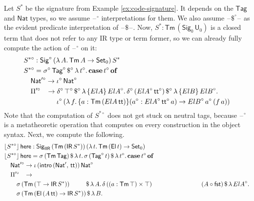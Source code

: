 \documentclass[acmsmall,screen,review]{acmart}
\newcommand{\msf}[1]{{\mathsf{#1}}}
\newcommand{\mbf}[1]{{\mathbf{#1}}}
\newcommand{\U}{\msf{U}}
\newcommand{\Set}{\msf{Set}}
\newcommand{\Nat}{\msf{Nat}}
\newcommand{\El}{\msf{El}}
\newcommand{\Sig}{\msf{Sig}}
\newcommand{\Tag}{\msf{Tag}}
\newcommand{\case}{\mbf{case}}
\newcommand{\of}{\mbf{of}}
\newcommand{\ttt}{\msf{tt}}
\newcommand{\blank}{{\mathord{\hspace{1pt}\text{--}\hspace{1pt}}}}
\newcommand{\IR}{\msf{IR}}
\newcommand{\intro}{\msf{intro}}
\newcommand{\fst}{\msf{fst}}
\newcommand{\IIR}{\msf{IIR}}
\newcommand{\floord}[1]{\lfloor #1 \rfloor}
\newcommand{\Tm}{\msf{Tm}}
\newcommand{\w}{\circ}
\newcommand{\here}{\msf{here}}
\newcommand{\Ssw}{S^{*\w}}
\begin{document}
\begin{example}\label{ex:code-canonicity-signature}
Let $S^*$ be the signature from Example \ref{ex:code-signature}. It depends on the $\Tag$ and $\Nat$
types, so we assume $\blank^\w$ interpretations for them. We also assume $\blank\$^\w\blank$ as the
evident predicate interpretation of $\blank\$\blank$. Now, $S^* :
\Tm\,(\Sig_0\,\U_0)$ is a closed term that does not refer to any IR type or term former, so we can
already fully compute the action of $\blank^\w$ on it:
\begin{alignat*}{3}
  & \Ssw : \Sig^\w\,(\lambda\,A.\,\Tm\,A \to \Set_0)\,S^*\\
  & \Ssw = \sigma^\w\,\Tag^\w\,\$^\w\,\lambda\,t^\w.\,\case\,t^\w\,\of \\
  & \quad \Nat'^\w \to \iota^\w\,\Nat^\w \\
  & \quad \Pi'^\w\hspace{0.85em} \to \delta^\w\,\top^\w\,\$^\w\,\lambda\,\{{ElA}\}\,{ElA}^\w.\,
                                    \delta^\w\,({ElA}^\w\,\ttt^\w)\,\$^\w\,\lambda\,\{{ElB}\}\,{ElB}^\w.\,\\
  & \hspace{4.8em}\iota^\w\, (\lambda\,f.\,\{a : \Tm\,({ElA}\,\ttt)\}(a^\w : {ElA}^\w\,\ttt^\w\,a) \to {ElB}^\w\,a^\w\,(f\,a))
\end{alignat*}
Note that the computation of $\Ssw$ does not get stuck on neutral tags, because $\blank^\w$ is a
metatheoretic operation that computes on every construction in the object syntax. Next, we compute
the following.
\begin{alignat*}{4}
  & \floord{\Ssw}\,\here : \Sig_\IIR\,(\Tm\,(\IR\,S^*))\,(\lambda\,t.\,\Tm\,(\El\,t) \to \Set_0)\\
  & \floord{\Ssw}\,\here = \sigma\,(\Tm\,\Tag)\,\$\,\lambda\,t.\,\sigma\,(\Tag^\w\,t)\,\$\,\lambda\,t^\w.\,\case\,t^\w\,\of\\
  & \quad \Nat'^\w \to \iota\,(\intro\,(\Nat',\,\ttt))\,\Nat^\w\\
  & \quad \Pi'^\w\hspace{0.8em} \to \\
  & \hspace{2em} \sigma\,(\Tm\,(\top \to \IR\,S^*))\hspace{2.65em}\$\,\lambda\,A.\,
                      \delta\,((a : \Tm\,\top) \times \top)\hspace{7.95em}(A \circ \fst)\,\$\,\lambda\,{ElA}^\w.\\
  & \hspace{2em} \sigma\,(\Tm\,(\El\,(A\,\ttt) \to \IR\,S^*))\,\$\,\lambda\,B.\,

\end{alignat*}
\end{example}
\end{document}
